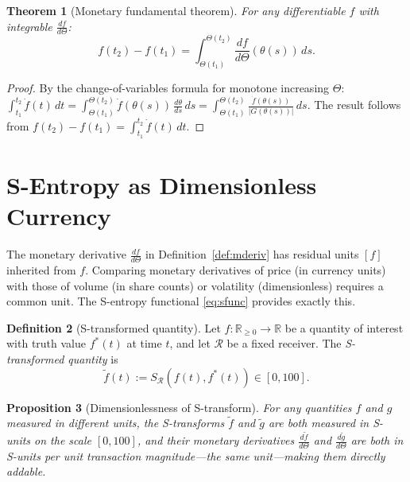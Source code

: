 \documentclass[twocolumn,11pt,a4paper]{article}
\theoremstyle{thmstyle}
\newtheorem{theorem}{Theorem}[section]
\newtheorem{proposition}[theorem]{Proposition}
\theoremstyle{definition}
\newtheorem{definition}[theorem]{Definition}
\theoremstyle{remark}
\newcommand{\Gain}{G}                        %
\newcommand{\Clock}{\Theta}                  %
\newcommand{\InvClock}{\theta}               %
\newcommand{\Mdiff}[1]{\frac{d#1}{d\Clock}} %
\newcommand{\Sval}{S}                        %
\newcommand{\Real}{\mathbb{R}}
\begin{document}
\begin{theorem}[Monetary fundamental theorem]\label{thm:mfundamental}
For any differentiable $f$ with integrable $\Mdiff{f}$:
\begin{equation}\label{eq:mfundamental}
  f(t_{2}) - f(t_{1})
  = \int_{\Clock(t_{1})}^{\Clock(t_{2})}
    \Mdiff{f}(\InvClock(s))\,ds.
\end{equation}
\end{theorem}

\begin{proof}
By the change-of-variables formula for monotone increasing
$\Clock$:
$\int_{t_{1}}^{t_{2}} \dot{f}(t)\,dt
= \int_{\Clock(t_{1})}^{\Clock(t_{2})}
  \dot{f}(\InvClock(s))\,\frac{d\InvClock}{ds}\,ds
= \int_{\Clock(t_{1})}^{\Clock(t_{2})}
  \frac{\dot{f}(\InvClock(s))}{|\Gain(\InvClock(s))|}\,ds$.
The result follows from
$f(t_{2})-f(t_{1})=\int_{t_{1}}^{t_{2}}\dot{f}(t)\,dt$.
\end{proof}


\section{S-Entropy as Dimensionless Currency}
\label{sec:sentropy}

The monetary derivative $\Mdiff{f}$ in Definition~\ref{def:mderiv}
has residual units $[f]$ inherited from $f$.  Comparing
monetary derivatives of price (in currency units) with
those of volume (in share counts) or volatility (dimensionless)
requires a common unit.  The S-entropy functional
\eqref{eq:sfunc} provides exactly this.

\begin{definition}[S-transformed quantity]\label{def:s-transform}
Let $f:\Real_{\geq 0}\to\Real$ be a quantity of interest
with truth value $f^{*}(t)$ at time $t$, and let
$\mathcal{R}$ be a fixed receiver.  The
\emph{S-transformed quantity} is
\begin{equation}
  \tilde{f}(t)
  := \Sval_{\mathcal{R}}(f(t), f^{*}(t)) \in [0,100].
\end{equation}
\end{definition}

\begin{proposition}[Dimensionlessness of S-transform]
\label{prop:dimensionless}
For any quantities $f$ and $g$ measured in different units,
the S-transforms $\tilde{f}$ and $\tilde{g}$ are both
measured in S-units on the scale $[0,100]$, and their
monetary derivatives $\Mdiff{\tilde{f}}$ and
$\Mdiff{\tilde{g}}$ are both in S-units per unit
transaction magnitude---the \emph{same unit}---making
them directly addable.
\end{proposition}
\end{document}
